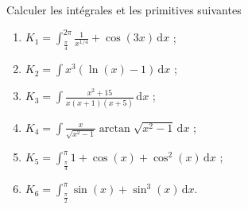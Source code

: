 
\begin{exercice}\label{exoautoanalyseCTU-19}

Calculer les intégrales et les primitives suivantes
\begin{multicols}{2}
  \begin{enumerate}
\item $K_{1}=\displaystyle\int_{\frac{\pi}{4}}^{2\pi}\frac{1}{x^{1/4}} + \cos(3x) \,\mathrm dx$ ; 
\item $K_{2}=\displaystyle\int x^3(\ln(x)-1) \,\mathrm dx$ ;
\item $K_{3}=\displaystyle\int \frac{x^2+15}{x(x+1)(x+5)} \,\mathrm dx$ ;
\item $K_{4}=\displaystyle \int  \frac{x}{\sqrt{x^2-1}} \arctan{\sqrt{x^2-1}} \,\mathrm dx$ ;
  \item $K_{5}=\displaystyle\int_{\frac{\pi}{4}}^{\pi}1+\cos (x) + \cos^2 (x) \,\mathrm dx$ ;
  \item $K_{6}=\displaystyle\int_{\frac{\pi}{2}}^{\pi}\sin (x) +  \sin^3 (x) \,\mathrm dx$.
  \end{enumerate}
\end{multicols}

\end{exercice}
